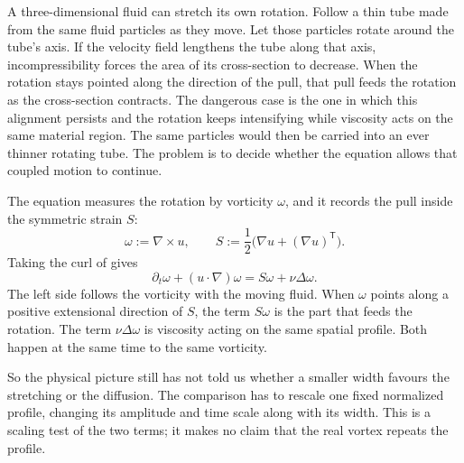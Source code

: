 A three-dimensional fluid can stretch its own rotation.
Follow a thin tube made from the same fluid particles as they move.
Let those particles rotate around the tube's axis.
If the velocity field lengthens the tube along that axis, incompressibility forces the area of its cross-section to decrease.
When the rotation stays pointed along the direction of the pull, that pull feeds the rotation as the cross-section contracts.
The dangerous case is the one in which this alignment persists and the rotation keeps intensifying while viscosity acts on the same material region.
The same particles would then be carried into an ever thinner rotating tube.
The problem is to decide whether the equation allows that coupled motion to continue.

The equation measures the rotation by vorticity \(\omega\), and it records the pull inside the symmetric strain \(S\):
\[
  \omega:=\nabla\times u,
  \qquad
  S:=\frac12\bigl(\nabla u+(\nabla u)^{\mathsf T}\bigr).
\]
Taking the curl of \NavierStokes{} gives
\begin{equation}\label{eq:VorticityEquation}
  \partial_t\omega+(u\cdot\nabla)\omega
  =S\omega+\nu\Delta\omega.
\end{equation}
The left side follows the vorticity with the moving fluid.
When \(\omega\) points along a positive extensional direction of \(S\), the term \(S\omega\) is the part that feeds the rotation.
The term \(\nu\Delta\omega\) is viscosity acting on the same spatial profile.
Both happen at the same time to the same vorticity.

So the physical picture still has not told us whether a smaller width favours the stretching or the diffusion.
The comparison has to rescale one fixed normalized profile, changing its amplitude and time scale along with its width.
This is a scaling test of the two terms; it makes no claim that the real vortex repeats the profile.
